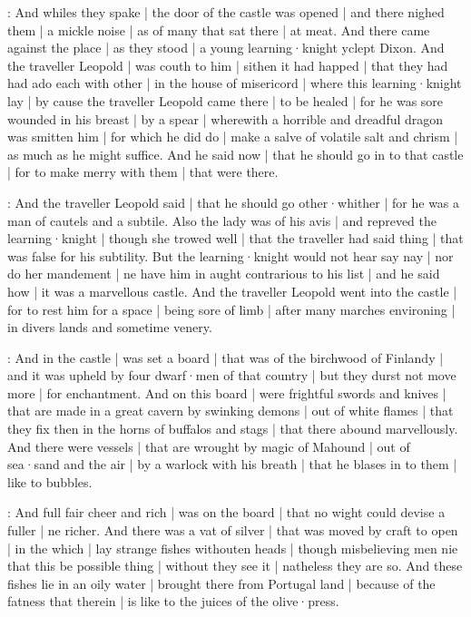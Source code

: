 

:
And whiles they spake |
the door of the castle was opened |
and there nighed them |
a mickle noise |
as of many that sat there |
at meat.
And there came against the place |
as they stood |
a young learning·knight yclept Dixon.
And the traveller Leopold |
was couth to him |
sithen it had happed |
that they had had ado each with other |
in the house of misericord |
where this learning·knight lay |
by cause the traveller Leopold came there |
to be healed |
for he was sore wounded in his breast |
by a spear |
wherewith a horrible and dreadful dragon was smitten him |
for which he did do |
make a salve of volatile salt and chrism |
as much as he might suffice.
And he said now |
that he should go in to that castle |
for to make merry with them |
that were there.

:
And the traveller Leopold said |
that he should go other·whither |
for he was a man of cautels and a subtile.
Also the lady was of his avis |
and repreved the learning·knight |
though she trowed well |
that the traveller had said thing |
that was false for his subtility.
But the learning·knight would not hear say nay |
nor do her mandement |
ne have him in aught contrarious to his list |
and he said how |
it was a marvellous castle.
And the traveller Leopold went into the castle |
for to rest him for a space |
being sore of limb |
after many marches environing |
in divers lands and sometime venery.


:
And in the castle |
was set a board |
that was of the birchwood of Finlandy |
and it was upheld by four dwarf·men of that country |
but they durst not move more |
for enchantment.
And on this board |
were frightful swords and knives |
that are made in a great cavern by swinking demons |
out of white flames |
that they fix then in the horns of buffalos and stags |
that there abound marvellously.
And there were vessels |
that are wrought by magic of Mahound |
out of sea·sand and the air |
by a warlock with his breath |
that he blases in to them |
like to bubbles.

:
And full fair cheer and rich |
was on the board |
that no wight could devise a fuller |
ne richer.
And there was a vat of silver |
that was moved by craft to open |
in the which |
lay strange fishes withouten heads |
though misbelieving men nie that this be possible thing |
without they see it |
natheless they are so.
And these fishes lie in an oily water |
brought there from Portugal land |
because of the fatness that therein |
is like to the juices of the olive·press.


